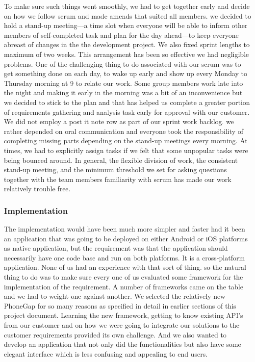 To make sure such things went smoothly, we had to get together early and decide on how we follow scrum and made amends that suited all members. we decided to hold a stand-up meeting---a time slot when everyone will be able to inform other members of self-completed task and plan for the day ahead---to keep everyone abreast of changes in the the development project. We also fixed sprint lengths to maximum of two weeks. This arrangement has been so effective we had negligible problems. One of the challenging thing to do associated with our scrum was to get something done on each day, to wake up early and show up every Monday to Thursday morning at 9 to relate our work. Some group members work late into the night and making it early in the morning was a bit of an inconvenience but we decided to stick to the plan and that has helped us complete a greater portion of requirements gathering and analysis task early for approval with our customer. We did not employ a post it note row as part of our sprint work backlog. we rather depended on oral communication and everyone took the responsibility of completing missing parts depending on the stand-up meetings every morning. At times, we had to explicitly assign tasks if we felt that some unpopular tasks were being bounced around. In general, the flexible division of work, the consistent stand-up meeting, and the minimum threshold we set for asking questions together with the team members familiarity with scrum has made our work relatively trouble free.
	\subsubsection{Implementation}
The implementation would have been much more simpler and faster had it been an application that was going to be deployed on either Android or iOS platforms as native application, but the requirement was that the application should necessarily have one code base and run on both platforms. It is a cross-platform application. None of us had an experience with that sort of thing. so the natural thing to do was to make sure every one of us evaluated some framework for the implementation of the requirement. A number of frameworks came on the table and we had to weight one against another. We selected the relatively new PhoneGap for so many reasons as specified in detail in earlier sections of this project document. Learning the new framework, getting to know existing API's from our customer and on how we were going to integrate our solutions to the customer requirements provided its own challenge. And we also wanted to develop an application that not only did the functionalities but also have some elegant interface which is less confusing and appealing to end users.

